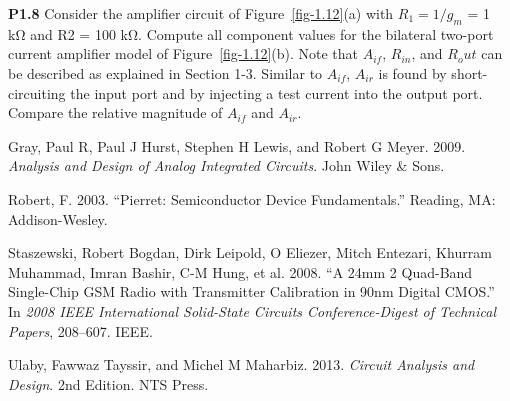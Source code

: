 \documentclass[
  11pt,
  letterpaper,
  abstract]{scrbook}
\newlength{\cslhangindent}
\newenvironment{CSLReferences}[2] %
 {\begin{list}{}{%
  \setlength{\itemindent}{0pt}
  \setlength{\leftmargin}{0pt}
  \setlength{\parsep}{0pt}
  \ifodd #1
   \setlength{\leftmargin}{\cslhangindent}
   \setlength{\itemindent}{-1\cslhangindent}
  \fi
  \setlength{\itemsep}{#2\baselineskip}}}
 {\end{list}}
\begin{document}
\textbf{P1.8} Consider the amplifier circuit of Figure~\ref{fig-1.12}(a)
with \(R_1 = 1/g_m\) = 1 kΩ and R2 = 100 kΩ. Compute all component
values for the bilateral two-port current amplifier model of
Figure~\ref{fig-1.12}(b). Note that \(A_{if}\), \(R_{in}\), and
\(R_out\) can be described as explained in Section 1-3. Similar to
\(A_{if}\), \(A_{ir}\) is found by short-circuiting the input port and
by injecting a test current into the output port. Compare the relative
magnitude of \(A_{if}\) and \(A_{ir}\).

\label{refs}
\begin{CSLReferences}{1}{0}
Gray, Paul R, Paul J Hurst, Stephen H Lewis, and Robert G Meyer. 2009.
\emph{Analysis and Design of Analog Integrated Circuits}. John Wiley \&
Sons.

Robert, F. 2003. {``Pierret: Semiconductor Device Fundamentals.''}
Reading, MA: Addison-Wesley.

Staszewski, Robert Bogdan, Dirk Leipold, O Eliezer, Mitch Entezari,
Khurram Muhammad, Imran Bashir, C-M Hung, et al. 2008. {``A 24mm 2
Quad-Band Single-Chip GSM Radio with Transmitter Calibration in 90nm
Digital CMOS.''} In \emph{2008 IEEE International Solid-State Circuits
Conference-Digest of Technical Papers}, 208--607. IEEE.

Ulaby, Fawwaz Tayssir, and Michel M Maharbiz. 2013. \emph{Circuit
Analysis and Design}. 2nd Edition. NTS Press.

\end{CSLReferences}


\backmatter
\end{document}
